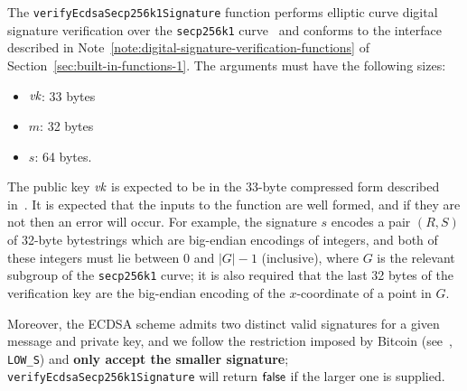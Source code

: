 \label{note:verify-ecdsa-secp256k1-signature}
The \texttt{verifyEcdsaSecp256k1Signature} function performs elliptic curve
digital signature verification \cite{ANSI-X9.62, ANSI-x9.142,
  Johnson-Menezes-Vanstone-ECDSA} over the \texttt{secp256k1}
curve~\cite[\S2.4.1]{SECP256} and conforms to the interface described in
Note~\ref{note:digital-signature-verification-functions} of
Section~\ref{sec:built-in-functions-1}.  The arguments must have the
following sizes:
\begin{itemize}
\item $\textit{vk}$: 33 bytes
\item $m$: 32 bytes
\item $s$: 64 bytes.
\end{itemize}
The public key $\textit{vk}$ is expected to be in the 33-byte compressed form described
in~\cite{Bitcoin-ECDSA}.  It is expected that the inputs to the function are
well formed, and if they are not then an error will occur.  For example, the
signature $s$ encodes a pair $(R,S)$ of 32-byte bytestrings which are big-endian
encodings of integers, and both of these integers must lie between 0 and
$\left|G\right|-1$ (inclusive), where $G$ is the relevant subgroup of the
\texttt{secp256k1} curve; it is also required that the last 32 bytes of the
verification key are the big-endian encoding of the $x$-coordinate of a point in
$G$.

Moreover, the ECDSA scheme admits two distinct valid
signatures for a given message and private key, and  we follow the restriction
imposed by Bitcoin (see~\cite{BIP-146},
\texttt{LOW\_S}) and \textbf{only accept the smaller signature};
\texttt{verifyEcdsa\-Secp\-256k1Signature} will return $\mathsf{false}$ if the larger
one is supplied.

%

